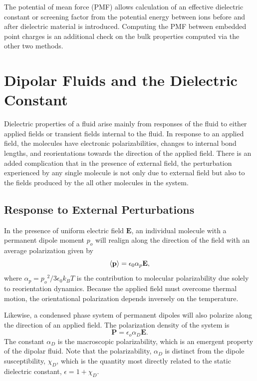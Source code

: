 The potential of mean force (PMF) allows calculation of an effective
dielectric constant or screening factor from the potential energy
between ions before and after dielectric material is introduced.
Computing the PMF between embedded point charges is an additional
check on the bulk properties computed via the other two methods.

\section{Dipolar Fluids and the Dielectric Constant}

Dielectric properties of a fluid arise mainly from responses of the
fluid to either applied fields or transient fields internal to the
fluid. In response to an applied field, the molecules have electronic
polarizabilities, changes to internal bond lengths, and reorientations
towards the direction of the applied field. There is an added
complication that in the presence of external field, the perturbation
experienced by any single molecule is not only due to external field
but also to the fields produced by the all other molecules in the
system.

\subsection{Response to External Perturbations}

In the presence of uniform electric field $\mathbf{E}$, an individual
molecule with a permanent dipole moment $p_o$ will realign along the
direction of the field with an average polarization given by
\begin{equation}
\braket{\mathbf{p}} = \epsilon_0 \alpha_p \mathbf{E},
\end{equation}
where $\alpha_p = {p_o}^2 / 3 \epsilon_0 k_B T$ is the contribution to
molecular polarizability due solely to reorientation dynamics.
Because the applied field must overcome thermal motion, the
orientational polarization depends inversely on the temperature.

Likewise, a condensed phase system of permanent dipoles will also
polarize along the direction of an applied field. The polarization
density of the system is
\begin{equation}
\textbf{P} = \epsilon_o \alpha_{D} \mathbf{E}. 
\label{pertDipole}
\end{equation} 
The constant $\alpha_D$ is the macroscopic polarizability, which is an
emergent property of the dipolar fluid.  Note that the polarizability,
$\alpha_D$ is distinct from the dipole susceptibility, $\chi_D$,
which is the quantity most directly related to the static dielectric
constant, $\epsilon = 1 + \chi_D$.

